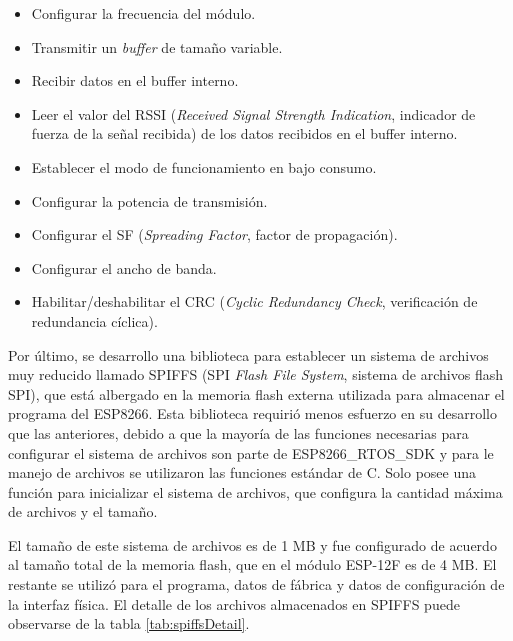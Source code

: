 \begin{itemize}
	\item Configurar la frecuencia del módulo.
	\item Transmitir un \textit{buffer} de tamaño variable.
	\item Recibir datos en el buffer interno.
	\item Leer el valor del RSSI (\textit{Received Signal Strength Indication}, indicador de fuerza de la señal recibida) de los datos recibidos en el buffer interno.
	\item Establecer el modo de funcionamiento en bajo consumo.
	\item Configurar la potencia de transmisión.
	\item Configurar el SF (\textit{Spreading Factor}, factor de propagación).
	\item Configurar el ancho de banda.
	\item Habilitar/deshabilitar el CRC (\textit{Cyclic Redundancy Check}, verificación de redundancia cíclica).
\end{itemize}

Por último, se desarrollo una biblioteca para establecer un sistema de archivos muy reducido llamado SPIFFS (SPI \textit{Flash File System}, sistema de archivos flash SPI), que está albergado en la memoria flash externa utilizada para almacenar el programa del ESP8266. Esta biblioteca requirió menos esfuerzo en su desarrollo que las anteriores, debido a que la mayoría de las funciones necesarias para configurar el sistema de archivos son parte de ESP8266\_RTOS\_SDK y para le manejo de archivos se utilizaron las funciones estándar de C. Solo posee una función para inicializar el sistema de archivos, que configura la cantidad máxima de archivos y el tamaño.

El tamaño de este sistema de archivos es de 1 MB y fue configurado de acuerdo al tamaño total de la memoria flash, que en el módulo ESP-12F es de 4 MB. El restante se utilizó para el programa, datos de fábrica y datos de configuración de la interfaz física. El detalle de los archivos almacenados en SPIFFS puede observarse de la tabla \ref{tab:spiffsDetail}.

